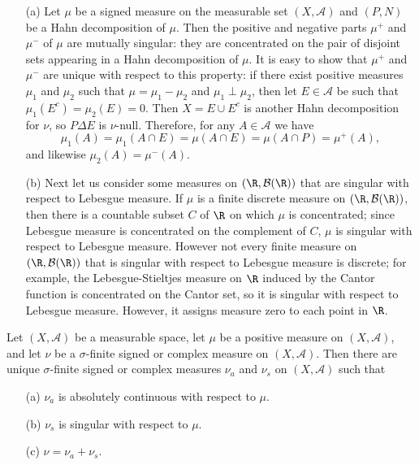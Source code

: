 \begin{example}\label{singluar measure eg}
\mbox{}
\begin{itemize}
\item[(a)] Let $\mu$ be a signed measure on the measurable set $(X,\mathcal{A})$ and $(P,N)$ be a Hahn decomposition of $\mu$. Then the positive and negative parts $\mu^+$ and $\mu^-$ of $\mu$ are mutually singular: they are concentrated on the pair of disjoint sets appearing in a Hahn decomposition of $\mu$. It is easy to show that $\mu^+$ and $\mu^-$ are unique with respect to this property: if there exist positive measures $\mu_1$ and $\mu_2$ such that $\mu=\mu_1-\mu_2$ and $\mu_1\perp\mu_2$, then let $E\in\mathcal{A}$ be such that $\mu_1(E^c)=\mu_2(E)=0$. Then $X=E\cup E^c$ is another Hahn decomposition for $\nu$, so $P\Delta E$ is $\nu$-null. Therefore, for any $A\in\mathcal{A}$ we have
\[\mu_1(A)=\mu_1(A\cap E)=\mu(A\cap E)=\mu(A\cap P)=\mu^+(A),\]
and likewise $\mu_2(A)=\mu^-(A)$. 
\item[(b)] Next let us consider some measures on $(\R,\mathcal{B}(\R))$ that are singular with respect to Lebesgue measure. If $\mu$ is a finite discrete measure on $(\R,\mathcal{B}(\R))$, then there is a countable subset $C$ of $\R$ on which $\mu$ is concentrated; since Lebesgue measure is concentrated on the complement of $C$, $\mu$ is singular with respect to Lebesgue measure. However not every finite measure on $(\R,\mathcal{B}(\R))$ that is singular with respect to Lebesgue measure is discrete; for example, the Lebesgue-Stieltjes measure on $\R$ induced by the Cantor function is concentrated on the Cantor set, so it is singular with respect to Lebesgue measure. However, it assigns measure zero to each point in $\R$.
\end{itemize}
\end{example}
\begin{theorem}
Let $(X,\mathcal{A})$ be a measurable space, let $\mu$ be a positive measure on $(X,\mathcal{A})$, and let $\nu$ be a $\sigma$-finite signed or complex measure on $(X,\mathcal{A})$. Then there are unique $\sigma$-finite signed or complex measures $\nu_a$ and $\nu_s$ on $(X,\mathcal{A})$ such that
\begin{itemize}
\item[(a)] $\nu_a$ is absolutely continuous with respect to $\mu$.
\item[(b)] $\nu_s$ is singular with respect to $\mu$.
\item[(c)] $\nu=\nu_a+\nu_s$.  
\end{itemize}
\end{theorem}
